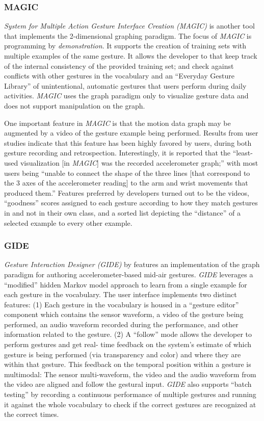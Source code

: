 \subsubsection{MAGIC}

 \emph{System for Multiple Action Gesture Interface Creation (MAGIC)} is another tool that implements the 2-dimensional graphing paradigm. The focus of \emph{MAGIC} is programming by \emph{demonstration}. It supports the creation of training sets with multiple examples of the same gesture. It allows the developer to that keep track of the internal consistency of the provided training set; and check against conflicts with other gestures in the vocabulary and an “Everyday Gesture Library” of unintentional, automatic gestures that users perform during daily activities. \emph{MAGIC} uses the graph paradigm only to visualize gesture data and does not support manipulation on the graph.

One important feature in \emph{MAGIC} is that the motion data graph may be augmented by a video of the gesture example being performed. Results from user studies indicate that this feature has been highly favored by users, during both gesture recording and retrospection. Interestingly, it is reported that the “least-used visualization [in \emph{MAGIC}] was the recorded accelerometer graph;” with most users being “unable to connect the shape of the three lines [that correspond to the 3 axes of the accelerometer reading] to the arm and wrist movements that produced them.” Features preferred by developers turned out to be the videos, “goodness” scores assigned to each gesture according to how they match gestures in and not in their own class, and a sorted list depicting the “distance” of a selected example to every other example.

\subsubsection{GIDE}

\emph{Gesture Interaction Designer (GIDE)} by \textcite{Zamborlin:2014} features an implementation of the graph paradigm for authoring accelerometer-based mid-air gestures. \emph{GIDE} leverages a “modified” hidden Markov model approach to learn from a single example for each gesture in the vocabulary. The user interface implements two distinct features: (1) Each gesture in the vocabulary is housed in a “gesture editor” component which contains the sensor waveform, a video of the gesture being performed, an audio waveform recorded during the performance, and other information related to the gesture. (2) A “follow” mode allows the developer to perform gestures and get real- time feedback on the system’s estimate of which gesture is being performed (via transparency and color) and where they are within that gesture. This feedback on the temporal position within a gesture is multimodal: The sensor multi-waveform, the video and the audio waveform from the video are aligned and follow the gestural input. \emph{GIDE} also supports “batch testing” by recording a continuous performance of multiple gestures and running it against the whole vocabulary to check if the correct gestures are recognized at the correct times.

